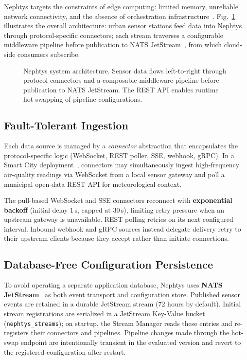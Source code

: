 \documentclass[conference]{IEEEtran}
\begin{document}
Nephtys targets the constraints of edge computing: limited memory, unreliable network connectivity, and the absence of orchestration infrastructure~\cite{shi2016edge}. Fig.~\ref{fig:arch} illustrates the overall architecture: urban sensor stations feed data into Nephtys through protocol-specific connectors; each stream traverses a configurable middleware pipeline before publication to NATS JetStream~\cite{nats2026}, from which cloud-side consumers subscribe.

\begin{figure}[t]
  \centering
  
  \caption{Nephtys system architecture. Sensor data flows left-to-right through protocol connectors and a composable middleware pipeline before publication to NATS JetStream. The REST API enables runtime hot-swapping of pipeline configurations.}
  \label{fig:arch}
\end{figure}

\subsection{Fault-Tolerant Ingestion}

Each data source is managed by a \emph{connector} abstraction that encapsulates the protocol-specific logic (WebSocket, REST poller, SSE, webhook, gRPC). In a Smart City deployment~\cite{zanella2014iot}, connectors may simultaneously ingest high-frequency air-quality readings via WebSocket from a local sensor gateway and poll a municipal open-data REST API for meteorological context.

The pull-based WebSocket and SSE connectors reconnect with \textbf{exponential backoff} (initial delay 1\,s, capped at 30\,s), limiting retry pressure when an upstream gateway is unavailable. REST polling retries on its next configured interval. Inbound webhook and gRPC sources instead delegate delivery retry to their upstream clients because they accept rather than initiate connections.

\subsection{Database-Free Configuration Persistence}

To avoid operating a separate application database, Nephtys uses \textbf{NATS JetStream}~\cite{nats2026} as both event transport and configuration store. Published sensor events are retained in a durable JetStream stream (72 hours by default). Initial stream registrations are serialized in a JetStream Key-Value bucket (\texttt{nephtys\_streams}); on startup, the Stream Manager reads these entries and re-registers their connectors and pipelines. Pipeline changes made through the hot-swap endpoint are intentionally transient in the evaluated version and revert to the registered configuration after restart.
\end{document}
